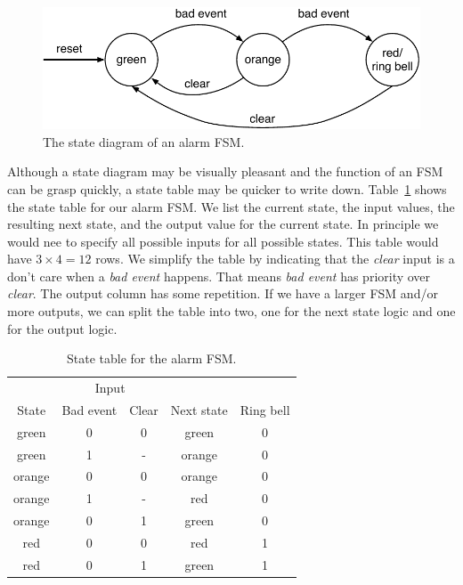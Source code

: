 \documentclass[%
    10pt,
    headinclude, footexclude,
    openright, %
    notitlepage,
    cleardoubleempty,
    headsepline,
    pointlessnumbers,
    bibtotoc, idxtotoc,
    ]{scrbook}
\newcommand{\scale}{0.7}
\begin{document}
\begin{figure}
  \centering
  \includegraphics[scale=\scale]{figures/state-diag-moore}
  \caption{The state diagram of an alarm FSM.}
  \label{fig:diag-moore}
\end{figure}

Although a state diagram may be visually pleasant and the function of an FSM
can be grasp quickly, a state table may be quicker to write down.
Table~\ref{tab:state:table} shows the state table for our alarm FSM.
We list the current state, the input values, the resulting next state, and
the output value for the current state. In principle we would nee to
specify all possible inputs for all possible states. This table would have
$3 \times 4 = 12$ rows. We simplify the table by indicating that the \emph{clear}
input is a don't care when a \emph{bad event} happens. That means
\emph{bad event} has priority over \emph{clear}. The output column
has some repetition. If we have a larger FSM and/or more outputs, we
can split the table into two, one for the next state logic and one for the
output logic.

\begin{table}
\centering
\caption{State table for the alarm FSM.}
\begin{tabular}{ccccc}
\toprule
& \multicolumn{2}{c}{Input} \\
\cmidrule{2-3}
State &  Bad event & Clear & Next state & Ring bell \\
\midrule
green & 0 & 0 & green & 0 \\
green & 1 & - & orange & 0 \\
orange & 0 & 0 & orange & 0 \\
orange & 1 & - & red & 0 \\
orange & 0 & 1 & green & 0 \\
red & 0 & 0 & red & 1 \\
red & 0 & 1 & green & 1 \\
\bottomrule
\end{tabular}
\label{tab:state:table}
\end{table}
\end{document}
